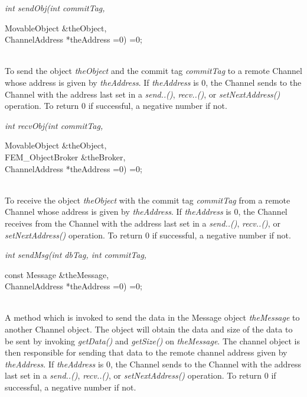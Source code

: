 {\em int sendObj(int commitTag, 

\indent\indent\indent\indent\indent MovableObject \&theObject, \\
\indent\indent\indent\indent\indent ChannelAddress
*theAddress =0) =0;}\\
To send the object {\em theObject} and the commit tag {\em commitTag}
to a remote Channel whose address is given by {\em theAddress}. If
{\em theAddress} is $0$, the Channel sends to the Channel with the
address last set in a {\em send..()}, {\em recv..()}, or {\em
setNextAddress()} operation. To return $0$ if successful, a negative
number if not. \\  

{\em int recvObj(int commitTag, 

\indent\indent\indent\indent\indent MovableObject \&theObject, \\
\indent\indent\indent\indent\indent FEM\_ObjectBroker \&theBroker, \\
\indent\indent\indent\indent\indent ChannelAddress
*theAddress =0) =0;}\\
To receive the object {\em theObject} with the commit tag {\em commitTag}
from a remote Channel whose address is given by {\em theAddress}. If
{\em theAddress} is $0$, the Channel receives from the Channel with the
address last set in a {\em send..()}, {\em recv..()}, or {\em
setNextAddress()} operation. To return $0$ if successful, a negative
number if not. \\  



{\em int sendMsg(int dbTag, int commitTag,  

\indent\indent\indent\indent\indent const Message \&theMessage, \\
\indent\indent\indent\indent\indent ChannelAddress *theAddress =0) =0;}\\
A method which is invoked to send the data in the Message object {\em
theMessage} to another Channel object. The object will obtain the
data and size of the data to be sent by invoking {\em getData()} and
{\em getSize()} on {\em theMessage}. The channel object is then
responsible for sending that data to the remote channel address given
by {\em theAddress}. If {\em theAddress} is $0$, the Channel sends to
the Channel with the address last set in a {\em send..()}, {\em
recv..()}, or {\em setNextAddress()} operation. To return $0$ if
successful, a negative number if not. \\  


